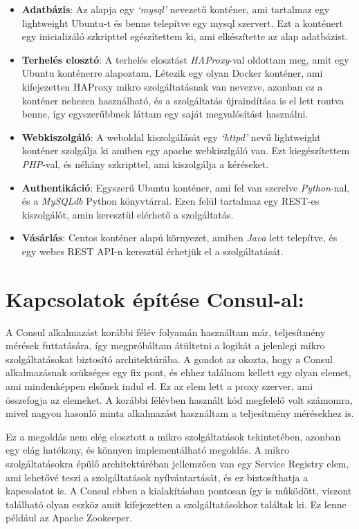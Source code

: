 \documentclass[11pt,magyar,a4paper,oneside,]{report}
\begin{document}
\begin{itemize}
\itemsep1pt\parskip0pt
\item
  \textbf{Adatbázis}: Az alapja egy \emph{`mysql'} nevezetű konténer,
  ami tartalmaz egy lightweight Ubuntu-t és benne telepítve egy mysql
  szervert. Ezt a konténert egy inicializáló szkripttel egészítettem ki,
  ami elkészítette az alap adatbázist.
\item
  \textbf{Terhelés elosztó}: A terhelés elosztást \emph{HAProxy}-val
  oldottam meg, amit egy Ubuntu konténerre alapoztam. Létezik egy olyan
  Docker konténer, ami kifejezetten HAProxy mikro szolgáltatásnak van
  nevezve, azonban ez a konténer nehezen használható, és a szolgáltatás
  újraindítása is el lett rontva benne, így egyszerűbbnek láttam egy
  saját megvalósítást használni.
\item
  \textbf{Webkiszolgáló}: A weboldal kiszolgálását egy \emph{`httpd'}
  nevű lightweight konténer szolgálja ki amiben egy apache webkiszlgáló
  van. Ezt kiegészítettem \emph{PHP}-val, és néhány szkripttel, ami
  kiszolgálja a kéréseket.
\item
  \textbf{Authentikáció}: Egyszerű Ubuntu konténer, ami fel van szerelve
  \emph{Python}-nal, és a \emph{MySQLdb} Python könyvtárral. Ezen felül
  tartalmaz egy REST-es kiszolgálót, amin keresztül elérhető a
  szolgáltatás.
\item
  \textbf{Vásárlás}: Centos konténer alapú környezet, amiben \emph{Java}
  lett telepítve, és egy webes REST API-n keresztül érhetjük el a
  szolgáltatását.
\end{itemize}

\section{Kapcsolatok építése
Consul-al:}\label{kapcsolatok-uxe9puxedtuxe9se-consul-al}

A Consul alkalmazást korábbi félév folyamán használtam már, teljesítmény
mérések futtatására, így megpróbáltam átültetni a logikát a jelenlegi
mikro szolgáltatásokat biztosító architektúrába. A gondot az okozta,
hogy a Consul alkalmazásnak szükséges egy fix pont, és ehhez találnom
kellett egy olyan elemet, ami mindenképpen elsőnek indul el. Ez az elem
lett a proxy szerver, ami összefogja az elemeket. A korábbi félévben
használt kód megfelelő volt számomra, mivel nagyon hasonló minta
alkalmazást használtam a teljesítmény mérésekhez is.

Ez a megoldás nem elég elosztott a mikro szolgáltatások tekintetében,
azonban egy elág hatékony, és könnyen implementálható megoldás. A mikro
szolgáltatásokra épülő architektúréban jellemzően van egy Service
Registry elem, ami lehetővé teszi a szolgáltatások nyílvántartását, és
ez biztosíthatja a kapcsolatot is. A Consul ebben a kialakításban
pontosan így is működött, viszont található olyan eszköz amit
kifejezetten a szolgáltatásokhoz találtak ki. Ez lenne például az Apache
Zookeeper.
\end{document}
